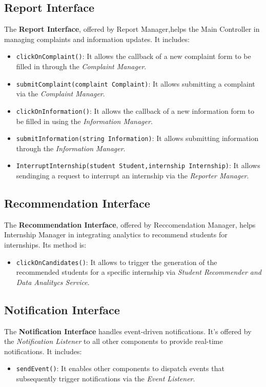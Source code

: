 \subsection{Report Interface}
The \textbf{Report Interface}, offered by Report Manager,helps the Main Controller in managing complaints and information updates. It includes:
\begin{itemize}
    \item \texttt{clickOnComplaint()}: It allows the callback of a new complaint form to be filled in through the \textit{Complaint Manager}.
    \item \texttt{submitComplaint(complaint Complaint)}: It allows submitting a complaint via the \textit{Complaint Manager}.
    \item \texttt{clickOnInformation()}: It allows the callback of a new information form to be filled in using the \textit{Information Manager}.
    \item \texttt{submitInformation(string Information)}: It allows submitting information through the \textit{Information Manager}.
    \item \texttt{InterruptInternship(student Student,internship Internship)}: It allows sendinging a request to interrupt an internship via the \textit{Reporter Manager}.
\end{itemize}

\subsection{Recommendation Interface}
The \textbf{Recommendation Interface}, offered by Reccomendation Manager, helps Internship Manager in integrating analytics to recommend students for internships. Its method is:
\begin{itemize}
    \item \texttt{clickOnCandidates()}: It allows to trigger the generation of the recommended students for a specific internship via \textit{Student Recommender and Data Analitycs Service}.
\end{itemize}

\subsection{Notification Interface}
The \textbf{Notification Interface} handles event-driven notifications. It's offered by the \textit{Notification Listener} to all other components to provide real-time notifications. It includes:
\begin{itemize}
    \item \texttt{sendEvent()}: It enables other components to dispatch events that subsequently trigger notifications via the \textit{Event Listener}.
\end{itemize}

